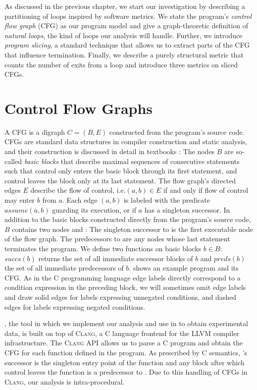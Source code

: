 As discussed in the previous chapter, we start our investigation by describing a partitioning of loops inspired by software metrics. We state the program's \emph{control flow graph} (CFG) as our program model and give a graph-theoretic definition of \emph{natural loops}, the kind of loops our analysis will handle. Further, we introduce \emph{program slicing}, a standard technique that allows us to extract parts of the CFG that influence termination. Finally, we describe a purely structural metric that counts the number of exits from a loop and introduce three metrics on sliced CFGs.

\section{Control Flow Graphs}

A CFG is a digraph $C = (B, E)$ constructed from the program's source code. CFGs are standard data structures in compiler construction and static analysis, and their construction is discussed in detail in textbooks \cite{DBLP:books/aw/AhoSU86}: The nodes $B$ are so-called \emph{basic blocks} that describe maximal sequences of consecutive statements such that control only enters the basic block through its first statement, and control leaves the block only at its last statement. The flow graph's directed edges $E$ describe the flow of control, i.e.\@ $(a, b) \in E$ if and only if flow of control may enter $b$ from $a$. Each edge $(a, b)$ is labeled with the predicate $assume(a, b)$ guarding its execution, or \true{} if $a$ has a singleton successor. In addition to the basic blocks constructed directly from the program's source code, $B$ contains two nodes \entry{} and \exit{}: The singleton successor to \entry{} is the first executable node of the flow graph. The predecessors to \exit{} are any nodes whose last statement terminates the program. We define two functions on basic blocks $b \in B$: $succs(b)$ returns the set of all immediate successor blocks of $b$ and $preds(b)$ the set of all immediate predecessors of $b$.  shows an example program and its CFG. As in the C programming language edge labels directly correspond to a condition expression in the preceding block, we will sometimes omit edge labels and draw solid edges for labels expressing unnegated conditions, and dashed edges for labels expressing negated conditions.

\sloopy{}, the tool in which we implement our analysis and use in  to obtain experimental data, is built on top of \textsc{Clang}, a C language frontend for the \textsc{LLVM} compiler infrastructure. The \textsc{Clang} API allows us to parse a C program and obtain the CFG for each function defined in the program. As prescribed by C semantics, \entry's successor is the singleton entry point of the function and any block after which control leaves the function is a predecessor to \exit{}. Due to this handling of CFGs in \textsc{Clang}, our analysis is intra-procedural.

